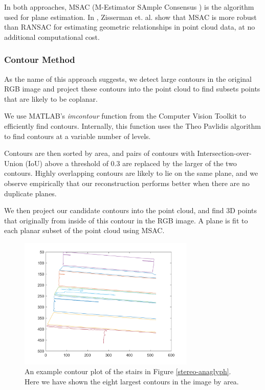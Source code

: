 In both approaches, MSAC (M-Estimator SAmple Consensus \cite{msac-article}) is the algorithm used for plane estimation. In \cite{msac-article}, Zisserman et. al. show that MSAC is more robust than RANSAC for estimating geometric relationships in point cloud data, at no additional computational cost.

\subsubsection{Contour Method} \label{contour-method}

As the name of this approach suggests, we detect large contours in the original RGB image and project these contours into the point cloud to find subsets points that are likely to be coplanar.

We use MATLAB's \textit{imcontour} function from the Computer Vision Toolkit to efficiently find contours. Internally, this function uses the Theo Pavlidis algorithm \cite{pavlidis} to find contours at a variable number of levels.

Contours are then sorted by area, and pairs of contours with Intersection-over-Union (IoU) above a threshold of 0.3 are replaced by the larger of the two contours. Highly overlapping contours are likely to lie on the same plane, and we observe empirically that our reconstruction performs better when there are no duplicate planes.

We then project our candidate contours into the point cloud, and find 3D points that originally from inside of this contour in the RGB image. A plane is fit to each planar subset of the point cloud using MSAC.

\begin{figure}[!h]
\centering
\includegraphics[width=3.3in]{Sections/Figures/good_contour_plot_12-7.png}
\caption{An example contour plot of the stairs in Figure \ref{stereo-anaglyph}. Here we have shown the eight largest contours in the image by area.}
\label{contours-example}
\end{figure}

